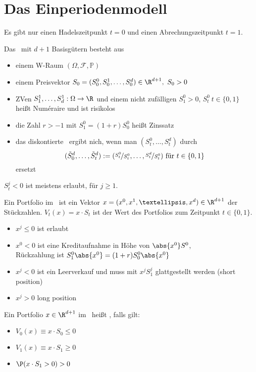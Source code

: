 	\section{Das Einperiodenmodell}
	Es gibt nur einen Hadelszeitpunkt $t=0$ und einen Abrechungszeitpunkt $t=1$.
	\begin{defi}
		Das \epm\ mit $d+1$ Basisgütern besteht aus 
		\begin{itemize}
			\item einem W-Raum $(\Omega,\mathcal{F},\mathbb{P})$
			\item einem Preisvektor $S_0=(S_0^0,S_0^1,\ldots,S_0^d)\in\R^{d+1},\ S_0> 0$
			\item ZVen  $S_1^1,\ldots,S_d^1:\Omega\to\R$ und einem nicht zufälligen $S_1^0> 0$, $S_t^0\ t\in\{0,1\}$ heißt Num\'eraire und ist risikolos
			\item die Zahl $r> -1$ mit $S_1^0=(1+r)S_0^0$ heißt Zinssatz
			\item das diskontierte \epm\ ergibt nich, wenn man $(S_t^0,\ldots,S_t^d)$ durch 
			\[(\tilde{S}_0^d,\ldots,\tilde{S}_t^d):=(\nicefrac{S_t^0}{S_t^0},\ldots,\nicefrac{S_t^d}{S_t^0})\text{ für }t\in\{0,1\} \] ersetzt 
		\end{itemize}
	\end{defi}
	\begin{bem}
		$S_t^j<0$ ist meistens erlaubt, für $j\ge1$.
	\end{bem}
	\begin{defi}
		Ein Portfolio im \epm\ ist ein Vektor  $x=(x^0,x^1,…,x^d)\in \R^{d+1}$ der Stückzahlen. $V_t(x)=x\cdot S_t$ ist der Wert des Portfolios zum Zeitpunkt $t\in\{0,1\}$.
	\end{defi}
	\begin{bem}\leavevmode
		\begin{itemize}
			\item $x^j\le0$ ist erlaubt
			\item $x^0<0$ ist eine Kreditaufnahme in Höhe von $\abs{x^0}S^0$, \\Rückzahlung ist $S_1^0\abs{x^0}=(1+r)S^0_0\abs{x^0}$
			\item $x^j<0$ ist ein Leerverkauf und muss mit $x^jS_1^j$ glattgestellt werden (short position)
			\item $x^j>0$ long position
		\end{itemize}
	\end{bem}
	\begin{defi}
		Ein Portfolio $x\in\R^{d+1}$ im \epm\ heißt \am, falls gilt:
		\begin{itemize}
			\item $V_0(x)\equiv x\cdot S_0\le0$
			\item $V_1(x)\equiv x\cdot S_1\ge 0$
			\item $\P (x\cdot S_1>0)>0$
		\end{itemize}
	\end{defi}
